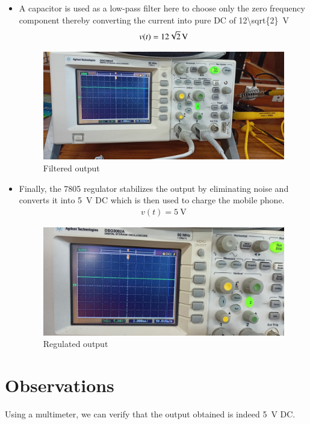 \documentclass[journal,12pt,twocolumn]{IEEEtran}
\numberwithin{equation}{section}
\numberwithin{figure}{section}
\begin{document}
\begin{itemize}
	\item A capacitor is used as a low-pass filter here to choose only the zero frequency component thereby converting the current into pure DC of \SI[parse-numbers=false]{12\sqrt{2}}{\volt}
	\begin{align}
		v(t) = \SI[parse-numbers=false]{12\sqrt{2}}{\volt}
	\end{align}

	\begin{figure}[!ht]
		\centering
		\includegraphics[width=\columnwidth]{./figs/filter.jpg}
		\caption{Filtered output}
		\label{fig-filter}	
	\end{figure}
	
	\item Finally, the 7805 regulator stabilizes the output by eliminating noise and converts it into \SI{5}{\volt} DC which is then used to charge the mobile phone.
	\begin{align}
		v(t) = \SI{5}{\volt}
	\end{align}
	\begin{figure}[!ht]
		\centering
		\includegraphics[width=\columnwidth]{./figs/regulator.jpg}
		\caption{Regulated output}
		\label{fig-regulator}	
	\end{figure}
	\end{itemize}
	
	\section{Observations}
	Using a multimeter, we can verify that the output obtained is indeed \SI{5}{\volt} DC.
	
	
	
	
\end{document}
